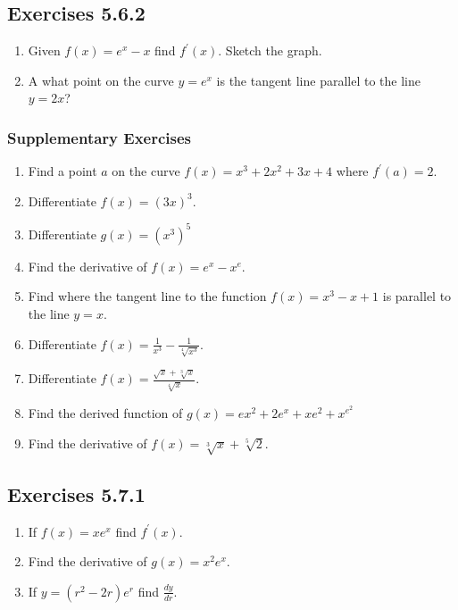 \subsection{Exercises 5.6.2}
\begin{enumerate}
	\item Given $f (x) =e^{x} -x$ find $f^{ \prime } (x)$. Sketch the graph. 
	
	\item A
	what point on the curve $y =e^{x}$ is the tangent line parallel to the line $y =2 x$? \end{enumerate}


\subsubsection{Supplementary Exercises}
\begin{enumerate}
	\item Find a point $a$ on the curve $f (x) =x^{3} +2 x^{2} +3 x +4$ where $f^{ \prime } (a) =2$. 
	
	\item Differentiate $f (x) =\left (3 x\right )^{3}$. 
	
	\item Differentiate $g (x) =\left (x^{3}\right )^{5}$ 
	
	\item Find the derivative of $f (x) =e^{x} -x^{e}$. 
	
	\item Find where the tangent line to the function $f (x) =x^{3} -x +1$ is parallel to the line $y =x$. 
	
	\item Differentiate $f (x) =\frac{1}{x^{3}} -\frac{1}{\sqrt[{4}]{x^{3}}}$. 
	
	\item Differentiate $f (x) =\frac{\sqrt{x} +\sqrt[{3}]{x}}{\sqrt[{4}]{x}}$. 
	
	\item Find the derived function of $g (x) =e x^{2} +2 e^{x} +x e^{2} +x^{e^{2}}$ 
	
	\item Find the derivative of $f (x) =\sqrt[{3}]{x} +\sqrt[{5}]{2}$. \end{enumerate}


\subsection{Exercises 5.7.1}
\begin{enumerate}
	\item If $f (x) =x e^{x}$ find $f^{ \prime } (x)$. 
	
	\item Find the derivative of $g (x) =x^{2} e^{x}$. 
	
	\item If $y =\left (r^{2} -2 r\right ) e^{r}$ find $\frac{d y}{d r}$. \end{enumerate}


